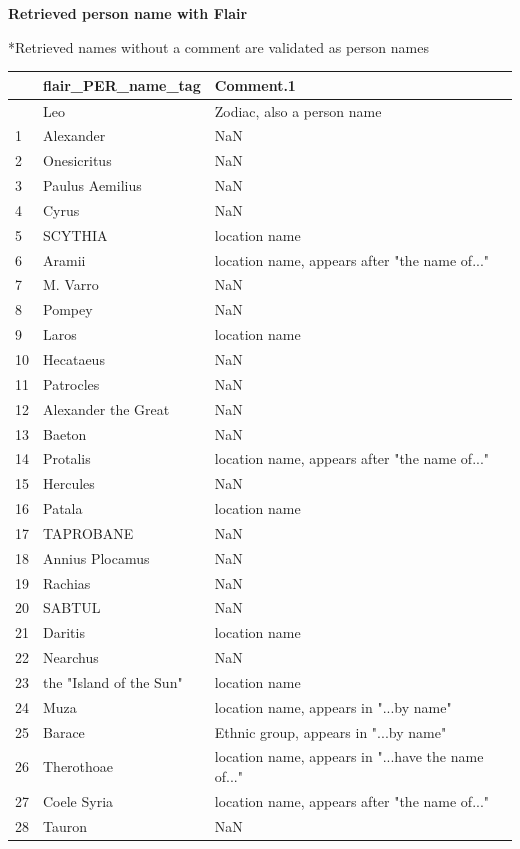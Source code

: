 \documentclass[
  12pt,
]{article}
\begin{document}
\newpage

\textbf{Retrieved person name with Flair}

*Retrieved names without a comment are validated as person names

\begin{longtable}[]{@{}lll@{}}
\toprule\noalign{}
& flair\_PER\_name\_tag & Comment.1 \\
\midrule\noalign{}
\endhead
\bottomrule\noalign{}
\endlastfoot
0 & Leo & Zodiac, also a person name \\
1 & Alexander & NaN \\
2 & Onesicritus & NaN \\
3 & Paulus Aemilius & NaN \\
4 & Cyrus & NaN \\
5 & SCYTHIA & location name \\
6 & Aramii & location name, appears after "the name of..." \\
7 & M. Varro & NaN \\
8 & Pompey & NaN \\
9 & Laros & location name \\
10 & Hecataeus & NaN \\
11 & Patrocles & NaN \\
12 & Alexander the Great & NaN \\
13 & Baeton & NaN \\
14 & Protalis & location name, appears after "the name of..." \\
15 & Hercules & NaN \\
16 & Patala & location name \\
17 & TAPROBANE & NaN \\
18 & Annius Plocamus & NaN \\
19 & Rachias & NaN \\
20 & SABTUL & NaN \\
21 & Daritis & location name \\
22 & Nearchus & NaN \\
23 & the "Island of the Sun" & location name \\
24 & Muza & location name, appears in "...by name" \\
25 & Barace & Ethnic group, appears in "...by name" \\
26 & Therothoae & location name, appears in "...have the name of..." \\
27 & Coele Syria & location name, appears after "the name of..." \\
28 & Tauron & NaN \\

\end{longtable}
\end{document}
